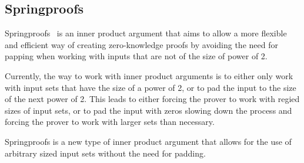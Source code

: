 \subsection{Springproofs}\label{sec:background-springproofs}
Springproofs~\cite{zhang2024springproofs} is an inner product argument that aims to allow a more flexible and efficient way of creating zero-knowledge proofs by avoiding the need for papping when working with inputs that are not of the size of power of 2.

Currently, the way to work with inner product arguments is to either only work with input sets that have the size of a power of 2, or to pad the input to the size of the next power of 2.
This leads to either forcing the prover to work with regied sizes of input sets, or to pad the input with zeros slowing down the process and forcing the prover to work with larger sets than necessary.

Springproofs is a new type of inner product argument that allows for the use of arbitrary sized input sets without the need for padding.


